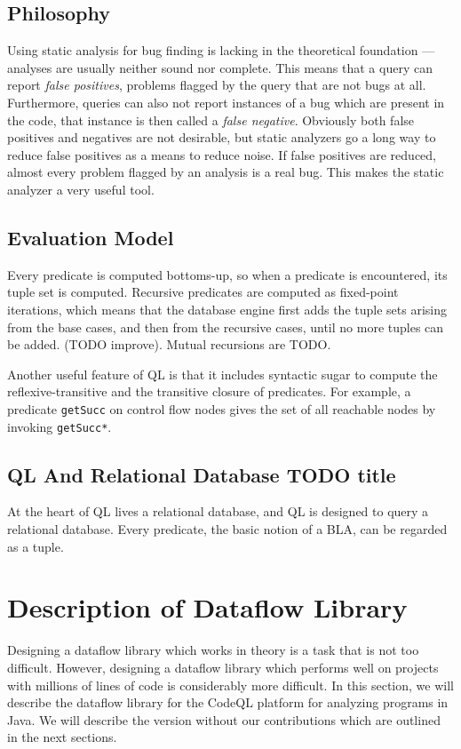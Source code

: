 \subsection{Philosophy}
Using static analysis for bug finding is lacking in the theoretical foundation {---} 
analyses are usually neither sound nor complete.
This means that a query can report \emph{false positives}, problems flagged by the query that 
are not bugs at all.
Furthermore, queries can also not report instances of a bug which are present in the code,
that instance is then called a \emph{false negative}.
Obviously both false positives and negatives are not desirable, but static analyzers go a long way
to reduce false positives as a means to reduce noise.
If false positives are reduced, almost every problem flagged by an analysis is a real bug.
This makes the static analyzer a very useful tool.

\cite{qlpaper}
\subsection{Evaluation Model}
Every predicate is computed bottoms-up, so when a predicate is encountered, its
tuple set is computed.
Recursive predicates are computed as fixed-point iterations, which means that the database engine 
first adds the tuple sets arising from the base cases, and then from the recursive cases, until
no more tuples can be added. (TODO improve).
Mutual recursions are TODO.

Another useful feature of QL is that it includes syntactic sugar to compute the reflexive-transitive
and the transitive closure of predicates.
For example, a predicate \texttt{getSucc} on control flow nodes gives the set of all reachable
nodes by invoking \texttt{getSucc*}.

\subsection{QL And Relational Database TODO title}
At the heart of QL lives a relational database, and QL is designed to query a relational database.
Every predicate, the basic notion of a BLA, can be regarded as a tuple.

\newpage
\section{Description of Dataflow Library}
Designing a dataflow library which works in theory is a task that is not too difficult.
However, designing a dataflow library which performs well on projects with millions of lines of code is 
considerably more difficult.
In this section, we will describe the dataflow library for the CodeQL platform %
for analyzing programs in Java.
We will describe the version without our contributions which are outlined in the next sections.

